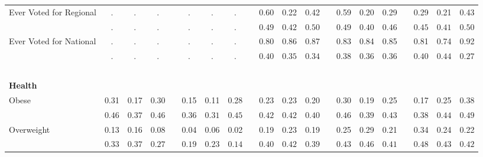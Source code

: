 \begin{center}
{\begin{longtable}{L{5cm} c c c p{.5cm} c c c p{.5cm} c c c p{.5cm} c c c p{.5cm} c c c}
 \quad Ever Voted for Regional & . &         . &         . & &         . &         . &         . & &      0.60 &      0.22 &      0.42 & &      0.59 &      0.20 &      0.29 & &      0.29 &      0.21 &      0.43 \\*
 \quad & $\mathit{        .}$ & $\mathit{        .}$ & $\mathit{        .}$ & & $\mathit{        .}$ & $\mathit{        .}$ & $\mathit{        .}$ & & $\mathit{     0.49}$ & $\mathit{     0.42}$ & $\mathit{     0.50}$ & & $\mathit{     0.49}$ & $\mathit{     0.40}$ & $\mathit{     0.46}$ & & $\mathit{     0.45}$ & $\mathit{     0.41}$ & $\mathit{     0.50}$ \\[.2em]
 \quad Ever Voted for National & . &         . &         . & &         . &         . &         . & &      0.80 &      0.86 &      0.87 & &      0.83 &      0.84 &      0.85 & &      0.81 &      0.74 &      0.92 \\*
 \quad & $\mathit{        .}$ & $\mathit{        .}$ & $\mathit{        .}$ & & $\mathit{        .}$ & $\mathit{        .}$ & $\mathit{        .}$ & & $\mathit{     0.40}$ & $\mathit{     0.35}$ & $\mathit{     0.34}$ & & $\mathit{     0.38}$ & $\mathit{     0.36}$ & $\mathit{     0.36}$ & & $\mathit{     0.40}$ & $\mathit{     0.44}$ & $\mathit{     0.27}$ \\[.2em]
 ~\\[-.5em]
\textbf{Health} \\[.6em]
 \quad Obese & 0.31 &      0.17 &      0.30 & &      0.15 &      0.11 &      0.28 & &      0.23 &      0.23 &      0.20 & &      0.30 &      0.19 &      0.25 & &      0.17 &      0.25 &      0.38 \\*
 \quad & $\mathit{     0.46}$ & $\mathit{     0.37}$ & $\mathit{     0.46}$ & & $\mathit{     0.36}$ & $\mathit{     0.31}$ & $\mathit{     0.45}$ & & $\mathit{     0.42}$ & $\mathit{     0.42}$ & $\mathit{     0.40}$ & & $\mathit{     0.46}$ & $\mathit{     0.39}$ & $\mathit{     0.43}$ & & $\mathit{     0.38}$ & $\mathit{     0.44}$ & $\mathit{     0.49}$ \\[.2em]
 \quad Overweight & 0.13 &      0.16 &      0.08 & &      0.04 &      0.06 &      0.02 & &      0.19 &      0.23 &      0.19 & &      0.25 &      0.29 &      0.21 & &      0.34 &      0.24 &      0.22 \\*
 \quad & $\mathit{     0.33}$ & $\mathit{     0.37}$ & $\mathit{     0.27}$ & & $\mathit{     0.19}$ & $\mathit{     0.23}$ & $\mathit{     0.14}$ & & $\mathit{     0.40}$ & $\mathit{     0.42}$ & $\mathit{     0.39}$ & & $\mathit{     0.43}$ & $\mathit{     0.46}$ & $\mathit{     0.41}$ & & $\mathit{     0.48}$ & $\mathit{     0.43}$ & $\mathit{     0.42}$ \\[.2em]

\end{longtable}}
\end{center}

